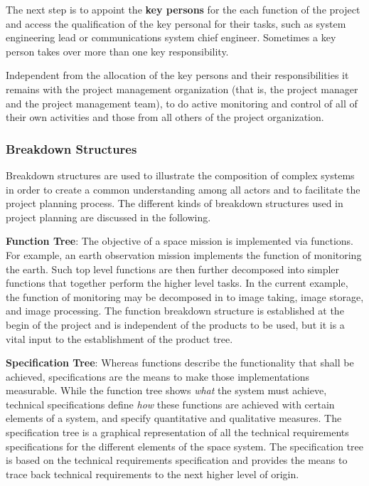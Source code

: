 The next step is to appoint the \textbf{key persons} for the each function of the project and access the qualification of the key personal for their tasks, such as system engineering lead or communications system chief engineer. Sometimes a key person takes over more than one key responsibility.

Independent from the allocation of the key persons and their responsibilities it remains with the project management organization (that is, the project manager and the project management team), to do active monitoring and control of all of their own activities and those from all others of the project organization. 

\subsubsection{Breakdown Structures}

Breakdown structures are used to illustrate the composition of complex systems in order to create a common understanding among all actors and to facilitate the project planning process. The different kinds of breakdown structures used in project planning are discussed in the following.

\textbf{Function Tree}: The objective of a space mission is implemented via functions. For example, an earth observation mission implements the function of monitoring the earth. Such top level functions are then further decomposed into simpler functions that together perform the higher level tasks. In the current example, the function of monitoring may be decomposed in to image taking, image storage, and image processing. The function breakdown structure is established at the begin of the project and is independent of the products to be used, but it is a vital input to the establishment of the product tree. 

\textbf{Specification Tree}: Whereas functions describe the functionality that shall be achieved, specifications are the means to make those implementations measurable. While the function tree shows \textit{what} the system must achieve, technical specifications define \textit{how} these functions are achieved with certain elements of a system, and specify quantitative and qualitative measures. The specification tree is a graphical representation of all the technical requirements specifications for the different elements of the space system.  The specification tree is based on the technical requirements specification and provides the means to trace back technical requirements to the next higher level of origin. 

